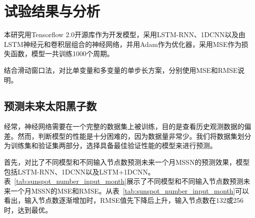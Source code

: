 \section{试验结果与分析}

本研究用Tensorflow 2.0开源库作为开发模型，采用LSTM-RNN、1DCNN以及由LSTM神经元和卷积层组合的神经网络，并用Adam作为优化器，采用MSE作为损失函数，模型一共训练1000个周期。

结合滑动窗口法，对比单变量和多变量的单步长方案，分别使用MSE和RMSE说明。

\subsection{预测未来太阳黑子数}\label{subsec:预测未来太阳黑子数}

经常，神经网络需要在一个完整的数据集上被训练，目的是查看历史观测数据的偏差。然而，判断模型的性能是十分困难的，因为数据量非常少。我们将数据集划分为训练集和验证集两部分，选择具备最佳验证性能的模型来进行预测。

首先，对比了不同模型和不同输入节点数预测未来一个月MSSN的预测效果，模型包括LSTM-RNN、1DCNN以及LSTM+1DCNN。表~\ref{tab:sunspot_number_input_month}展示了不同模型和不同输入节点数预测未来一个月MSSN的MSE和RMSE。从表~\ref{tab:sunspot_number_input_month}可以看出，输入节点数逐渐增加时，RMSE值先下降后上升，输入节点数在132或256时，达到最优。

